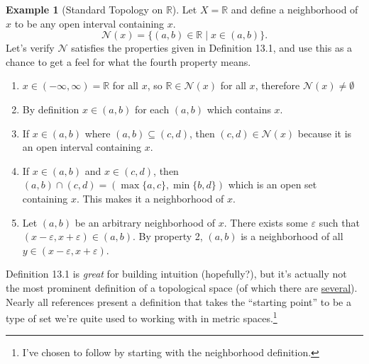 \documentclass{article}
\newcommand{\R}{\mathbb{R}}
\theoremstyle{definition}
\newtheorem{example}{Example}[section]
\begin{document}
\begin{example}[Standard Topology on $\R$]
	Let $X=\R$ and define a neighborhood of $x$ to be any open interval containing $x$. $$ \mathcal N(x) = \{(a,b)\in \R \mid x\in(a,b)\}.$$ Let's verify $\mathcal N$ satisfies the properties given in Definition 13.1, and use this as a chance to get a feel for what the fourth property means.
	\begin{enumerate}
		\item $x\in (-\infty,\infty) = \R$ for all $x$, so $\R\in \mathcal N(x)$ for all $x$, therefore $\mathcal N(x)\neq \emptyset$ 
		\item By definition $x\in (a,b)$ for each $(a,b)$ which contains $x$.
		\item If $x\in(a,b)$ where $(a,b)\subseteq (c,d)$, then $(c,d)\in \mathcal N(x)$ because it is an open interval containing $x$.
		\item If $x\in(a,b)$ and $x\in(c,d)$, then $(a,b)\cap(c,d) = (\max\{a,c\}, \min\{b,d\})$ which is an open set containing $x$. This makes it a neighborhood of $x$.
		\item Let $(a,b)$ be an arbitrary neighborhood of $x$. There exists some $\varepsilon$ such that $(x-\varepsilon,x+\varepsilon)\in (a,b)$. By property 2, $(a,b)$ is a neighborhood of all $y\in(x-\varepsilon,x+\varepsilon)$.
	\end{enumerate}
	
\end{example}

Definition 13.1 is \textit{great} for building intuition (hopefully?), but it's actually not the most prominent definition of a topological space (of which there are \href{https://en.wikipedia.org/wiki/Axiomatic_foundations_of_topological_spaces}{several}). Nearly all references present a definition that takes the ``starting point'' to be a type of set we're quite used to working with in metric spaces.\footnote{I've chosen to follow \cite{brown2006topology} by starting with the neighborhood definition.}
\end{document}
